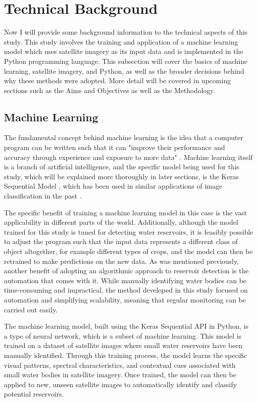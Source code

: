\section{Technical Background}
Now I will provide some background information to the technical aspects of this study. This study involves the training and application of a machine learning model which uses satellite imagery as its input data and is implemented in the Python programming language. This subsection will cover the basics of machine learning, satellite imagery, and Python, as well as the broader decisions behind why these methods were adopted. More detail will be covered in upcoming sections such as the Aims and Objectives as well as the Methodology. 

\subsection{Machine Learning}
The fundamental concept behind machine learning is the idea that a computer program can be written such that it can "improve their performance and accuracy through experience and exposure to more data" \citep{ibm_2021}. Machine learning itself is a branch of artificial intelligence, and the specific model being used for this study, which will be explained more thoroughly in later sections, is the Keras Sequential Model \citep{chollet_2020}, which has been used in similar applications of image classification in the past \citep{imageclassification_2024}. 

The specific benefit of training a machine learning model in this case is the vast applicability in different parts of the world. Additionally, although the model trained for this study is tuned for detecting water reservoirs, it is feasibly possible to adjust the program such that the input data represents a different class of object altogether, for example different types of crops, and the model can then be retrained to make predictions on the new data. As was mentioned previously, another benefit of adopting an algorithmic approach to reservoir detection is the automation that comes with it. While manually identifying water bodies can be time-consuming and impractical, the method developed in this study focused on automation and simplifying scalability, meaning that regular monitoring can be carried out easily. 

The machine learning model, built using the Keras Sequential API in Python, is a type of neural network, which is a subset of machine learning. This model is trained on a dataset of satellite images where small water reservoirs have been manually identified. Through this training process, the model learns the specific visual patterns, spectral characteristics, and contextual cues associated with small water bodies in satellite imagery. Once trained, the model can then be applied to new, unseen satellite images to automatically identify and classify potential reservoirs.

